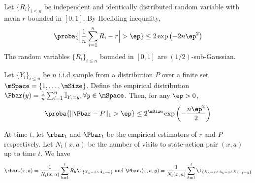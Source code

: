             \begin{thm}
            \label{thm:hoeffding}
                Let $\{R_i\}_{i\le n}$ be independent and identically distributed random variable with mean $r$ bounded in $[0,1]$.
                By Hoeffding inequality,
                \begin{align*}
                    \proba{\Big\vert\frac{1}{n}\sum_{i=1}^nR_i-r\Big\vert>\ep}\le2\exp\left(-2n\ep^2\right)
                \end{align*}
                The random variables $\{R_i\}_{i\le n}$ bounded in $[0,1]$ are $(1/2)$-sub-Gaussian.
            \end{thm}
            \begin{thm}
            \label{thm:weissman}
                Let $\{Y_i\}_{i\le n}$ be $n$ i.i.d sample from a distribution $P$ over a finite set $\mSpace=\{1,\dots,\mSize\}$. Define the empirical distribution $\Pbar(y)=\frac{1}{n}\sum_{i=1}^{n}\mathbb{I}_{Y_i=y}, \forall y\in\mSpace$. Then, for any $\ep>0$,
                \begin{align*}
                    \proba{\Vert\Pbar-P\Vert_1> \ep} \le 2^\mSize\exp\left(-\frac{n\ep^2}{2}\right)
                \end{align*}
            \end{thm}
            
            At time $t$, let $\rbar_t$ and $\Pbar_t$ be the empirical estimators of $r$ and $P$ respectively.
            Let $N_t(x,a)$ be the number of visits to state-action pair $(x,a)$ up to time $t$.
            We have
            \begin{align*}
                \rbar_t(x,a) =\frac1{N_t(x,a)}\sum_{h=1}^{t}R_h\I_{\{X_h=x\wedge A_h=a\}} \text{ and } \Pbar_t(x,a,y) =\frac1{N_t(x,a)}\sum_{h=1}^{t}\I_{\{X_h=x\wedge A_h=a\wedge X_{h+1}=y\}}
            \end{align*}

